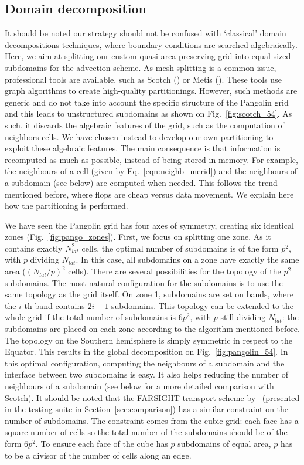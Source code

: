 \subsection{Domain decomposition}
\label{subsec:domain_decompos}
It should be noted our strategy should not be confused with `classical' domain
decompositions techniques, where boundary conditions are searched algebraically.
Here, we aim at splitting our custom quasi-area preserving grid into equal-sized
subdomains for the advection scheme. As mesh splitting is a common issue,
professional tools are available, such as Scotch (\cite{Pellegrini2012}) or
Metis (\cite{Karypis1995}). These tools use graph algorithms to create
high-quality partitionings. However, such methods are generic and do not take
into account the specific structure of the Pangolin grid and this leads to
unstructured subdomains as shown on Fig.~\ref{fig:scotch_54}. As such, it discards
the algebraic features of the grid, such as the computation of neighbors cells.
We have chosen instead to develop our own partitioning to exploit these algebraic
features. The main consequence is that information is recomputed as much as
possible, instead of being stored in memory. For example, the neighbours of a
cell (given by Eq.~\eqref{eqn:neighb_merid}) and the neighbours of a subdomain (see below)
are computed when needed. This follows the trend mentioned before, where flops
are cheap versus data movement. We explain here how the partitioning is
performed.

We have seen the Pangolin grid has four axes of symmetry, creating six identical
zones (Fig.~\ref{fig:pango_zones}). First, we focus on splitting one zone.  As
it contains exactly $N_{lat}^2$ cells, the optimal number of subdomains is of
the form $p^2$, with $p$ dividing $N_{lat}$. In this case, all subdomains on a
zone have exactly the same area (${(N_{lat}/p)}^2$ cells).  There are several
possibilities for the topology of the $p^2$ subdomains. The most natural
configuration for the subdomains is to use the same topology as the grid itself.
On zone 1, subdomains are set on bands, where the $i$-th band contains $2i-1$
subdomains.  This topology can be extended to the whole grid if the total number
of subdomains is $6p^2$, with $p$ still dividing $N_{lat}$: the subdomains are
placed on each zone according to the algorithm mentioned before. The topology on the
Southern hemisphere is simply symmetric in respect to the Equator.  This results
in the global decomposition on Fig.~\ref{fig:pangolin_54}. In this optimal
configuration, computing the neighbours of a subdomain and the interface between
two subdomains is easy. It also helps reducing the number of neighbours of a
subdomain (see below for a more detailed comparison with Scotch). It should be
noted that the FARSIGHT transport scheme by~\cite{White2011} (presented in the
testing suite in Section~\ref{sec:comparison}) has a similar constraint on the number
of subdomains. The constraint comes from the cubic grid: each face has a square
number of cells so the total number of the subdomains should be of the form
$6p^2$.  To ensure each face of the cube has $p$ subdomains of equal area, $p$
has to be a divisor of the number of cells along an edge.

